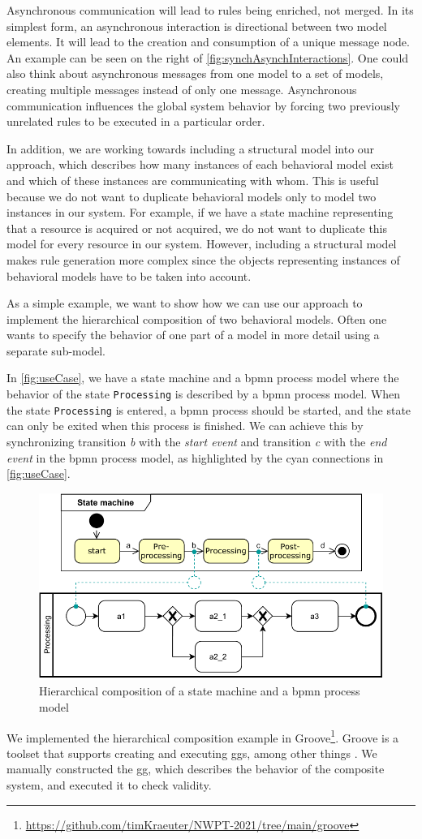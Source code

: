 \documentclass[a4paper]{easychair}
\begin{document}
Asynchronous communication will lead to rules being enriched, not merged.
In its simplest form, an asynchronous interaction is directional between two model elements.
It will lead to the creation and consumption of a unique message node.
An example can be seen on the right of \autoref{fig:synchAsynchInteractions}. 
One could also think about asynchronous messages from one model to a set of models, creating multiple messages instead of only one message.
Asynchronous communication influences the global system behavior by forcing two previously unrelated rules to be executed in a particular order.

In addition, we are working towards including a structural model into our approach, which describes how many instances of each behavioral model exist and which of these instances are communicating with whom.
This is useful because we do not want to duplicate behavioral models only to model two instances in our system.
For example, if we have a state machine representing that a resource is acquired or not acquired, we do not want to duplicate this model for every resource in our system.
However, including a structural model makes rule generation more complex since the objects representing instances of behavioral models have to be taken into account.

As a simple example, we want to show how we can use our approach to implement the hierarchical composition of two behavioral models.
Often one wants to specify the behavior of one part of a model in more detail using a separate sub-model.

In \autoref{fig:useCase}, we have a state machine and a \gls*{bpmn} process model where the behavior of the state \texttt{Processing} is described by a \gls*{bpmn} process model.
When the state \texttt{Processing} is entered, a \gls*{bpmn} process should be started, and the state can only be exited when this process is finished.
We can achieve this by synchronizing transition \textit{b} with the \textit{start event} and transition \textit{c} with the \textit{end event} in the \gls*{bpmn} process model, as highlighted by the cyan connections in \autoref{fig:useCase}.

\begin{figure}[h]
    \centering
    \includegraphics[width=.5\textwidth]{images/usecase.pdf}
    \caption{Hierarchical composition of a state machine and a \gls*{bpmn} process model}
    \label{fig:useCase}
\end{figure}
We implemented the hierarchical composition example in Groove\footnote{\url{https://github.com/timKraeuter/NWPT-2021/tree/main/groove}}.
Groove is a toolset that supports creating and executing \glspl*{gg}, among other things \cite{ghamarianModellingAnalysisUsing2012, rensinkGROOVESimulatorTool2004}.
We manually constructed the \gls*{gg}, which describes the behavior of the composite system, and executed it to check validity.
\end{document}
